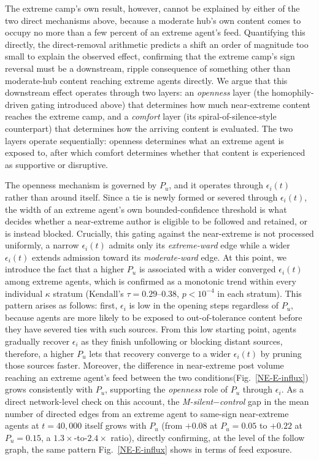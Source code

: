 \documentclass{svproc}
\def\BoundedConfidence{\epsilon} %
\def\VCR{\kappa}                 %
\begin{document}
The extreme camp's own result, however, cannot be explained by
either of the two direct mechanisms above, because 
a moderate hub's own
content comes to occupy no more than a few percent of an extreme
agent's feed. 
Quantifying this directly, the direct-removal arithmetic 
predicts a shift an order of magnitude too small
to explain the observed effect, 
confirming that the extreme camp's sign reversal must be a
downstream, ripple consequence of something other than
moderate-hub content reaching extreme agents directly.
We argue that this downstream effect operates through
two layers: an \emph{openness} layer (the homophily-driven gating
introduced above) that determines how much near-extreme content
reaches the extreme camp, and a \emph{comfort} layer (its
spiral-of-silence-style counterpart) that determines how the arriving
content is evaluated. The two layers operate sequentially: openness
determines what an extreme agent is exposed to, after which comfort
determines whether that content is experienced as supportive or
disruptive.

The openness mechanism is governed by $P_u$, and it operates through
$\BoundedConfidence_i(t)$ rather than around itself. Since a tie 
is newly formed or severed 
through $\BoundedConfidence_i(t)$, the width of an extreme agent's
own bounded-confidence threshold is what decides whether a
near-extreme author is eligible to be followed and retained, or is
instead blocked. Crucially, 
this gating against the near-extreme is not processed uniformly, 
a narrow
$\BoundedConfidence_i(t)$ admits only its \emph{extreme-ward} edge
while a wider $\BoundedConfidence_i(t)$ extends
admission toward its \emph{moderate-ward} edge.
At this point, we introduce the fact 
that a higher $P_u$ is associated
with a wider converged $\BoundedConfidence_i(t)$ among extreme
agents, which is confirmed as
a monotonic trend within every individual $\VCR$ stratum
(Kendall's $\tau=0.29$--$0.38$, $p<10^{-4}$ in each stratum).
This pattern arises as follows:
first, $\BoundedConfidence_i$ is low in the opening steps regardless of
$P_u$, because agents are more likely to be exposed to out-of-tolerance
content before they have severed ties with such sources. 
From this low
starting point, agents gradually recover $\BoundedConfidence_i$ as
they finish unfollowing or blocking distant sources, 
therefore, 
a higher $P_u$ lets that recovery
converge to a wider $\BoundedConfidence_i(t)$ 
by pruning those sources faster. 
Moreover, the
difference in near-extreme post volume reaching an extreme agent's
feed between the two conditions(Fig.~\ref{NE-E-influx}) grows consistently with $P_u$,
supporting the \emph{openness} role of $P_u$
through $\BoundedConfidence_i$. As a direct network-level check on
this account, the \emph{M-silent}$-$\emph{control} gap in the mean 
number of directed edges from an extreme agent to 
same-sign near-extreme agents at $t=40{,}000$ itself grows
with $P_u$ (from $+0.08$ at $P_u=0.05$ to $+0.22$ at $P_u=0.15$, a
$1.3\times$-to-$2.4\times$ ratio), directly confirming, at the level
of the follow graph, the same pattern
Fig.~\ref{NE-E-influx} shows in terms of feed exposure.
\end{document}
